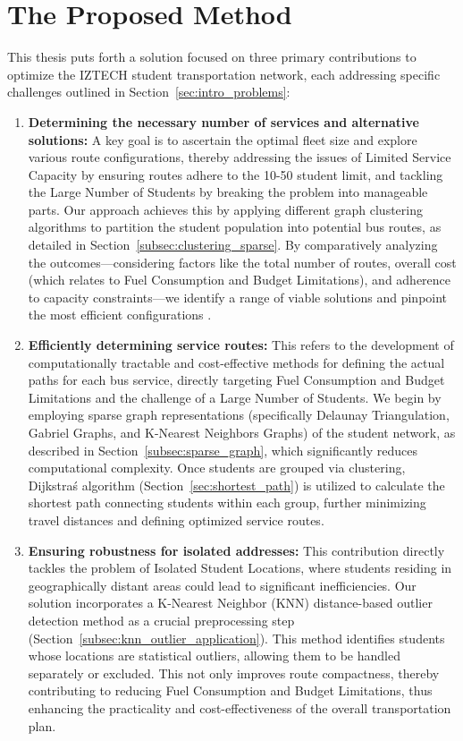 \section{The Proposed Method}
\label{sec:intro_solution}
This thesis puts forth a solution focused on three primary contributions to optimize the IZTECH student transportation network, each addressing specific challenges outlined in Section~\ref{sec:intro_problems}:

\begin{enumerate}
    \item \textbf{Determining the necessary number of services and alternative solutions:} A key goal is to ascertain the optimal fleet size and explore various route configurations, thereby addressing the issues of Limited Service Capacity by ensuring routes adhere to the 10-50 student limit, and tackling the Large Number of Students by breaking the problem into manageable parts. Our approach achieves this by applying different graph clustering algorithms to partition the student population into potential bus routes, as detailed in Section~\ref{subsec:clustering_sparse}. By comparatively analyzing the outcomes—considering factors like the total number of routes, overall cost (which relates to Fuel Consumption and Budget Limitations), and adherence to capacity constraints—we identify a range of viable solutions and pinpoint the most efficient configurations \cite{zhang2018data}.
    
    \item \textbf{Efficiently determining service routes:} This refers to the development of computationally tractable and cost-effective methods for defining the actual paths for each bus service, directly targeting Fuel Consumption and Budget Limitations and the challenge of a Large Number of Students. We begin by employing sparse graph representations (specifically Delaunay Triangulation, Gabriel Graphs, and K-Nearest Neighbors Graphs) of the student network, as described in Section~\ref{subsec:sparse_graph}, which significantly reduces computational complexity. Once students are grouped via clustering, Dijkstra\'s algorithm (Section~\ref{sec:shortest_path}) is utilized to calculate the shortest path connecting students within each group, further minimizing travel distances and defining optimized service routes.
    
    \item \textbf{Ensuring robustness for isolated addresses:} This contribution directly tackles the problem of Isolated Student Locations, where students residing in geographically distant areas could lead to significant inefficiencies. Our solution incorporates a K-Nearest Neighbor (KNN) distance-based outlier detection method as a crucial preprocessing step (Section~\ref{subsec:knn_outlier_application}). This method identifies students whose locations are statistical outliers, allowing them to be handled separately or excluded. This not only improves route compactness, thereby contributing to reducing Fuel Consumption and Budget Limitations, thus enhancing the practicality and cost-effectiveness of the overall transportation plan.
\end{enumerate}

